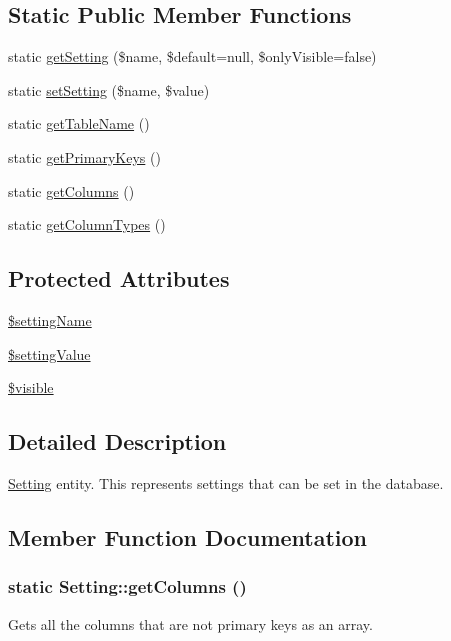 \subsection*{Static Public Member Functions}
\begin{DoxyCompactItemize}
\item 
static \hyperlink{classSetting_a693d5d8d46131900ab761ce01bb3d8cf}{getSetting} (\$name, \$default=null, \$onlyVisible=false)
\item 
static \hyperlink{classSetting_adbcf1f8af6c1832b0ad59d39b550a6d0}{setSetting} (\$name, \$value)
\item 
static \hyperlink{classSetting_ada9934fb4f6bddcf5250494b63d81c5e}{getTableName} ()
\item 
static \hyperlink{classSetting_a20ab54f018e4987326d20a5464c7e615}{getPrimaryKeys} ()
\item 
static \hyperlink{classSetting_ac1dc23d6b6f1fbd01ac0fd51e05cab3a}{getColumns} ()
\item 
static \hyperlink{classSetting_afde410fc459b142b11a50511414dc57d}{getColumnTypes} ()
\end{DoxyCompactItemize}
\subsection*{Protected Attributes}
\begin{DoxyCompactItemize}
\item 
\hyperlink{classSetting_a59ac482046073fcae2656721ff8f8f02}{\$settingName}
\item 
\hyperlink{classSetting_a68d581b6c71b46423725f4ea9361b1a4}{\$settingValue}
\item 
\hyperlink{classSetting_a96d719f1847bf10b5ea767fae9a6d9e0}{\$visible}
\end{DoxyCompactItemize}


\subsection{Detailed Description}
\hyperlink{classSetting}{Setting} entity. This represents settings that can be set in the database. 

\subsection{Member Function Documentation}
\hypertarget{classSetting_ac1dc23d6b6f1fbd01ac0fd51e05cab3a}{
\subsubsection[{getColumns}]{\setlength{\rightskip}{0pt plus 5cm}static Setting::getColumns ()}}
\label{classSetting_ac1dc23d6b6f1fbd01ac0fd51e05cab3a}
Gets all the columns that are not primary keys as an array. 

